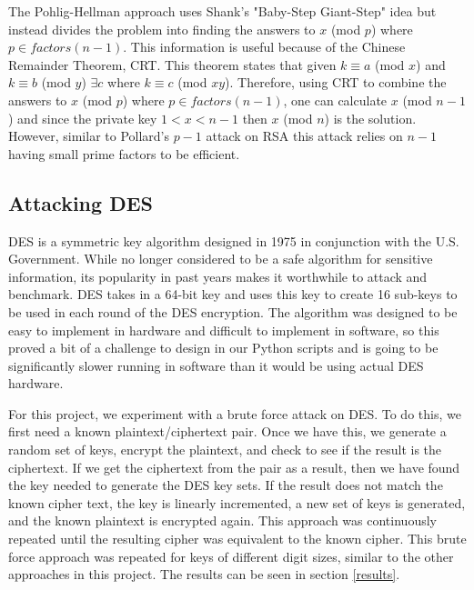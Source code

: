 \documentclass[12pt]{report}
\begin{document}
The Pohlig-Hellman approach uses Shank's "Baby-Step Giant-Step" idea but instead divides the problem into finding the answers to $x$ (mod $p$) where
$p \in factors(n-1)$. This information is useful because of the Chinese Remainder Theorem, CRT. This theorem states that given $k \equiv a$ (mod $x$) and
$k \equiv b$ (mod $y$) $\exists c$ where $k \equiv c$ (mod $xy$). Therefore, using CRT to combine the answers to $x$ (mod $p$) where $p \in factors(n-1)$, one can
calculate $x$ (mod $n-1$) and since the private key $1 < x < n-1$ then $x$ (mod $n$) is the solution. However, similar to Pollard's $p-1$ attack on RSA this attack
relies on $n-1$ having small prime factors to be efficient.


\subsection{Attacking DES}
DES is a symmetric key algorithm designed in 1975 in conjunction with the U.S. Government. While no longer considered to be a safe algorithm for sensitive
information, its popularity in past years makes it worthwhile to attack and benchmark. DES takes in a 64-bit key and uses this key to create 16 sub-keys to be used
in each round of the DES encryption. The algorithm was designed to be easy to implement in hardware and difficult to implement in software, so this proved a bit of
a challenge to design in our Python scripts and is going to be significantly slower running in software than it would be using actual DES hardware.

For this project, we experiment with a brute force attack on DES. To do this, we first need a known plaintext/ciphertext pair. Once we have this, we
generate a random set of keys, encrypt the plaintext, and check to see if the result is the ciphertext. If we get the ciphertext from the pair as a result, then we
have found the key needed to generate the DES key sets. If the result does not match the known cipher text, the key is linearly incremented, a new set of keys is
generated, and the known plaintext is encrypted again. This approach was continuously repeated until the resulting cipher was equivalent to the known cipher. This
brute force approach was repeated for keys of different digit sizes, similar to the other approaches in this project. The results can be seen in section \ref{results}.
\end{document}
